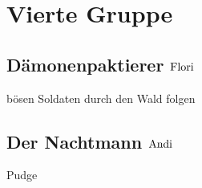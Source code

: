 \chapter{Vierte Gruppe}

\section{Dämonenpaktierer \hfill $\rm{Flori}$}
bösen Soldaten durch den Wald folgen
\section{Der Nachtmann \hfill $\rm{Andi}$}
Pudge